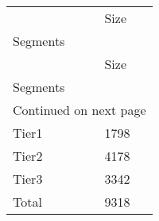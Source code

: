 \begin{longtable}[h!]{ll}
\toprule
{} &  Size \\
Segments &       \\
\midrule
\endfirsthead

\toprule
{} &  Size \\
Segments &       \\
\midrule
\endhead
\midrule
\multicolumn{2}{r}{{Continued on next page}} \\
\midrule
\endfoot

\bottomrule
\endlastfoot
Tier1    &  1798 \\
Tier2    &  4178 \\
Tier3    &  3342 \\
Total    &  9318 \\
\end{longtable}
